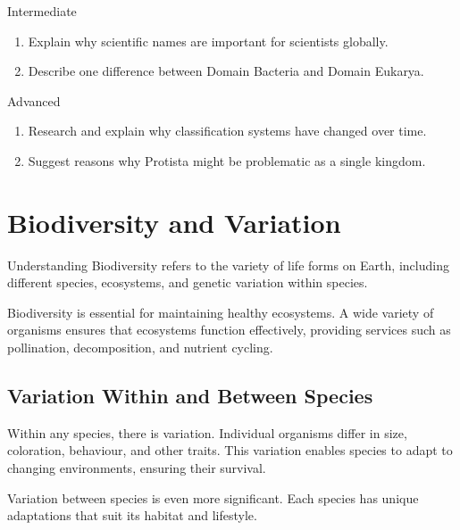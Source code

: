 \begin{tieredquestions}{Intermediate}
\begin{enumerate}
\item Explain why scientific names are important for scientists globally.
\item Describe one difference between Domain Bacteria and Domain Eukarya.
\end{enumerate}
\end{tieredquestions}

\begin{tieredquestions}{Advanced}
\begin{enumerate}
\item Research and explain why classification systems have changed over time.
\item Suggest reasons why Protista might be problematic as a single kingdom.
\end{enumerate}
\end{tieredquestions}

\section{Biodiversity and Variation}

\begin{keyconcept}{Understanding Biodiversity}
 refers to the variety of life forms on Earth, including different species, ecosystems, and genetic variation within species.
\end{keyconcept}

Biodiversity is essential for maintaining healthy ecosystems. A wide variety of organisms ensures that ecosystems function effectively, providing services such as pollination, decomposition, and nutrient cycling.

\subsection{Variation Within and Between Species}

Within any species, there is variation. Individual organisms differ in size, coloration, behaviour, and other traits. This variation enables species to adapt to changing environments, ensuring their survival.

Variation between species is even more significant. Each species has unique adaptations that suit its habitat and lifestyle.


